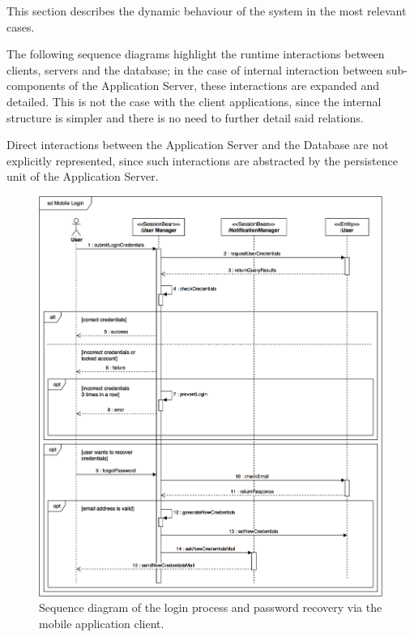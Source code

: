 This section describes the dynamic behaviour of the system in the most relevant cases.

The following sequence diagrams highlight the runtime interactions between clients, servers and the database; in the case of internal interaction between sub-components of the Application Server, these interactions are expanded and detailed. This is not the case with the client applications, since the internal structure is simpler and there is no need to further detail said relations.

Direct interactions between the Application Server and the Database are not explicitly represented, since such interactions are abstracted by the persistence unit of the Application Server.

\begin{figure}[H]
\begin{center}
		\includegraphics[width=\textwidth]{./arch_design/diagrams/login_mobile.png}
		\caption{Sequence diagram of the login process and password recovery via the mobile application client.}
		\label{login_sd}
\end{center}
\end{figure}

